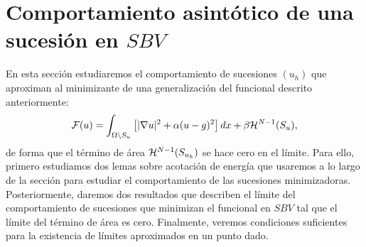 \documentclass[a4paper,11pt,spanish, twoside, leqno]{tfm-uam}
\begin{document}
\section{Comportamiento asintótico de una sucesión en $SBV$}
En esta sección estudiaremos el comportamiento de sucesiones $(u_{h})$ que aproximan al minimizante de una generalización del funcional descrito anteriormente:
\begin{align*}
\mathcal{F}(u)=\int_{\Omega\setminus S_{u}}\left [ \lvert\nabla{u}\rvert^{2}+\alpha(u-g)^{2}\right ]dx+\beta \mathcal{H}^{N-1}(S_{u}),
\end{align*}
de forma que el término de área $\mathcal{H}^{N-1}(S_{u_{h}})$ se hace cero en el límite. Para ello, primero estudiamos dos lemas sobre acotación de energía que usaremos a lo largo de la sección para estudiar el comportamiento de las sucesiones minimizadoras. Posteriormente, daremos dos resultados que describen el límite del comportamiento de sucesiones que minimizan el funcional en $SBV$ tal que el límite del término de área es cero. Finalmente, veremos condiciones suficientes para la existencia de límites aproximados en un punto dado. 
\end{document}
